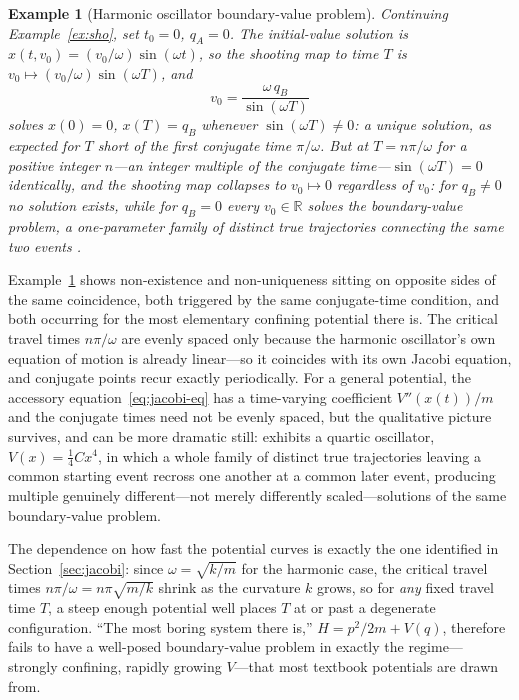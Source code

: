 \documentclass[11pt]{article}
\newtheorem{example}[proposition]{Example}
\newcommand{\R}{\mathbb{R}}
\begin{document}
\begin{example}[Harmonic oscillator boundary-value problem]
\label{ex:sho-bvp}
Continuing Example~\ref{ex:sho}, set $t_0=0$, $q_A=0$. The initial-value solution is $x(t,v_0)=(v_0/\omega)\sin(\omega t)$, so the shooting map to time $T$ is $v_0\mapsto (v_0/\omega)\sin(\omega T)$, and
\begin{equation}
v_0 = \frac{\omega\, q_B}{\sin(\omega T)}
\end{equation}
solves $x(0)=0$, $x(T)=q_B$ whenever $\sin(\omega T)\neq0$: a unique solution, as expected for $T$ short of the first conjugate time $\pi/\omega$. But at $T=n\pi/\omega$ for a positive integer $n$---an integer multiple of the conjugate time---$\sin(\omega T)=0$ identically, and the shooting map collapses to $v_0\mapsto 0$ regardless of $v_0$: for $q_B\neq0$ \emph{no} solution exists, while for $q_B=0$ \emph{every} $v_0\in\R$ solves the boundary-value problem, a one-parameter family of distinct true trajectories connecting the same two events \citep{gray2009}.
\end{example}

Example~\ref{ex:sho-bvp} shows non-existence and non-uniqueness sitting on opposite sides of the same coincidence, both triggered by the same conjugate-time condition, and both occurring for the most elementary confining potential there is. The critical travel times $n\pi/\omega$ are evenly spaced only because the harmonic oscillator's own equation of motion is already linear---so it coincides with its own Jacobi equation, and conjugate points recur exactly periodically. For a general potential, the accessory equation~\eqref{eq:jacobi-eq} has a time-varying coefficient $V''(x(t))/m$ and the conjugate times need not be evenly spaced, but the qualitative picture survives, and can be more dramatic still: \citet{gray2009} exhibits a quartic oscillator, $V(x)=\tfrac14 Cx^4$, in which a whole family of distinct true trajectories leaving a common starting event recross one another at a common later event, producing multiple genuinely different---not merely differently scaled---solutions of the same boundary-value problem.

The dependence on how fast the potential curves is exactly the one identified in Section~\ref{sec:jacobi}: since $\omega=\sqrt{k/m}$ for the harmonic case, the critical travel times $n\pi/\omega = n\pi\sqrt{m/k}$ shrink as the curvature $k$ grows, so for \emph{any} fixed travel time $T$, a steep enough potential well places $T$ at or past a degenerate configuration. ``The most boring system there is,'' $H=p^2/2m+V(q)$, therefore fails to have a well-posed boundary-value problem in exactly the regime---strongly confining, rapidly growing $V$---that most textbook potentials are drawn from.
\end{document}

